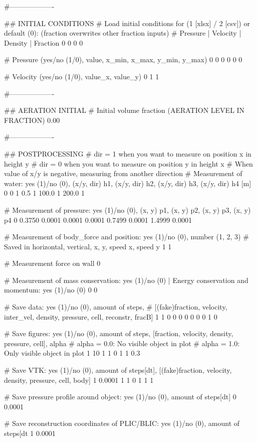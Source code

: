 #-------------------

## INITIAL CONDITIONS
# Load initial conditions for (1 [xlsx] / 2 [csv]) or default (0): (fraction overwrites other fraction inputs)
# Pressure 		| Velocity		| Density		| Fraction
0   0   0   0

# Pressure (yes/no (1/0), value, x_min, x_max, y_min, y_max)
0 0 0 0 0 0

# Velocity (yes/no (1/0), value_x, value_y)
0 1 1

#-------------------

## AERATION INITIAL
# Initial volume fraction (AERATION LEVEL IN FRACTION)
0.00

#-------------------

## POSTPROCESSING
# dir = 1 when you want to measure on position x in height y
# dir = 0 when you want to measure on position y in height x
# When value of x/y is negative, measuring from another direction
# Measurement of water: yes (1)/no (0), (x/y, dir) h1, (x/y, dir) h2, (x/y, dir) h3, (x/y, dir) h4 [m]
0   0 1  0.5 1  100.0 1  200.0 1

# Measurement of pressure: yes (1)/no (0), (x, y) p1, (x, y) p2, (x, y) p3, (x, y) p4
0	0.3750 0.0001	0.0001 0.0001	0.7499 0.0001     1.4999 0.0001

# Measurement of body_force and position: yes (1)/no (0), number (1, 2, 3)
# Saved in horizontal, vertical, x, y, speed x, speed y
1 1

# Measurement force on wall
0

# Measurement of mass conservation: yes (1)/no (0) | Energy conservation and momentum: yes (1)/no (0)
0 0

# Save data: yes (1)/no (0), amount of steps,
# [(fake)fraction, velocity, inter_vel, density, pressure, cell, reconstr, fracB]
1	1	0 0 0 0 0 0 0 1 0

# Save figures: yes (1)/no (0), amount of steps, [fraction, velocity, density, pressure, cell], alpha
# alpha = 0.0: No visible object in plot
# alpha = 1.0: Only visible object in plot
1 	10	1 1 0 1 1	0.3

# Save VTK: yes (1)/no (0), amount of steps[dt], [(fake)fraction, velocity, density, pressure, cell, body]
1	0.0001	1 1 0 1 1 1

# Save pressure profile around object: yes (1)/no (0), amount of steps[dt]
0  0.0001

# Save reconstruction coordinates of PLIC/BLIC: yes (1)/no (0), amount of steps[dt
1 0.0001
